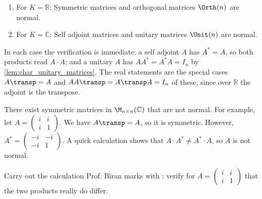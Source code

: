 \begin{example}
\begin{enumerate}[label=\textbf{(\alph*)}]
    \item For $K = \mathbb{R}$: Symmetric matrices and orthogonal matrices $\Orth(n)$ are normal.
    \item For $K = \mathbb{C}$: Self adjoint matrices and unitary matrices $\Unit(n)$ are normal.
\end{enumerate}
In each case the verification is immediate: a self adjoint $A$ has $A^* = A$, so both products read $A \cdot A$; and a unitary $A$ has $A A^* = A^* A = I_n$ by \cref{lem:char_unitary_matrices}. The real statements are the special cases $A\transp = A$ and $A A\transp = A\transp A = I_n$ of these, since over $\mathbb{R}$ the adjoint is the transpose.
\end{example}

\begin{remark}
There exist symmetric matrices in $\M_{n \times n}(\mathbb{C})$ that are not normal. For example, let $A = \left(\begin{smallmatrix} i & i \\ i & 1 \end{smallmatrix}\right)$. We have $A\transp = A$, so it is symmetric. However, $A^* = \left(\begin{smallmatrix} -i & -i \\ -i & 1 \end{smallmatrix}\right)$. A quick calculation shows that $A \cdot A^* \neq A^* \cdot A$, so $A$ is not normal.
\end{remark}

\begin{exercise}
\label{exc:symmetric_not_normal}
Carry out the calculation Prof. Biran marks with : verify for $A = \left(\begin{smallmatrix} i & i \\ i & 1 \end{smallmatrix}\right)$ that the two products really do differ.
\end{exercise}

